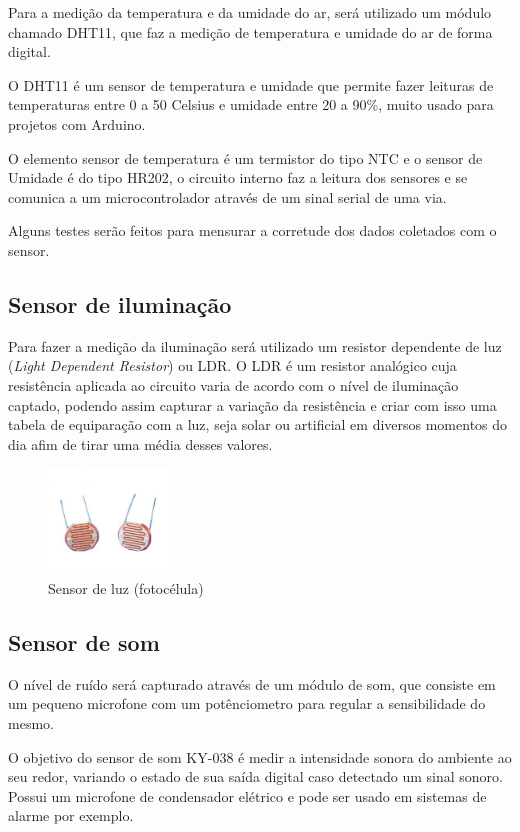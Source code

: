\documentclass[final,12pt, times, 5p, twocolumn]{elsarticle}
\begin{document}
Para a medição da temperatura e da umidade do ar, será utilizado um módulo chamado DHT11, que faz a medição de temperatura e umidade do ar de forma digital.

O DHT11 é um sensor de temperatura e umidade que permite fazer leituras de temperaturas entre 0 a 50 Celsius e umidade entre 20 a 90\%, muito usado para projetos com Arduino.

O elemento sensor de temperatura é um termistor do tipo NTC e o sensor de Umidade é do tipo HR202, o circuito interno faz a leitura dos sensores e se comunica a um microcontrolador através de um sinal serial de uma via.

Alguns testes serão feitos para mensurar a corretude dos dados coletados com o sensor.

\subsection{Sensor de iluminação}

Para fazer a medição da iluminação será utilizado um resistor dependente de luz (\textit{Light Dependent Resistor}) ou LDR. O LDR é um resistor analógico cuja resistência aplicada ao circuito varia de acordo com o nível de iluminação captado, podendo assim capturar a variação da resistência e criar com isso uma tabela de equiparação com a luz, seja  solar ou artificial em diversos momentos do dia afim de tirar uma média desses valores. 

\begin{figure}[ht!]
\centering
\includegraphics[width=0.3\textwidth]{ldr.jpg}
\caption{\label{fig:ldr}Sensor de luz (fotocélula)}
\end{figure}

\subsection{Sensor de som}

O nível de ruído será capturado através de um módulo de som, que consiste em um pequeno microfone com um potênciometro para regular a sensibilidade do mesmo.

O objetivo do sensor de som KY-038 é medir a intensidade sonora do ambiente ao seu redor, variando o estado de sua saída digital caso detectado um sinal sonoro. Possui um microfone de condensador elétrico e pode ser usado em sistemas de alarme por exemplo.
\end{document}
